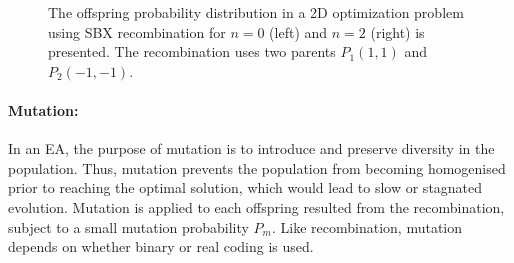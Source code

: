 \begin{itemize}
\begin{figure}[h!]
\begin{minipage}[b]{0.5\linewidth}
 \centering
\end{minipage}
\begin{minipage}[b]{0.5\linewidth}
 \centering
\end{minipage}
\caption{The offspring probability distribution in a 2D optimization problem using SBX recombination for $n=0$ (left) and $n=2$ (right) is presented. The recombination uses two parents $P_1(1,1)$ and $P_2(-1,-1)$.}
\label{sbx2}
\end{figure}
\end{itemize}

\FloatBarrier   
\paragraph{Mutation:}
In an EA, the purpose of mutation is to introduce and preserve diversity in the population. Thus, mutation prevents the population from becoming homogenised prior to reaching the optimal solution, which would lead to slow or stagnated evolution. Mutation is applied to each offspring resulted from the recombination, subject to a small mutation probability $P_m$. Like recombination, mutation depends on whether binary or real coding is used.

